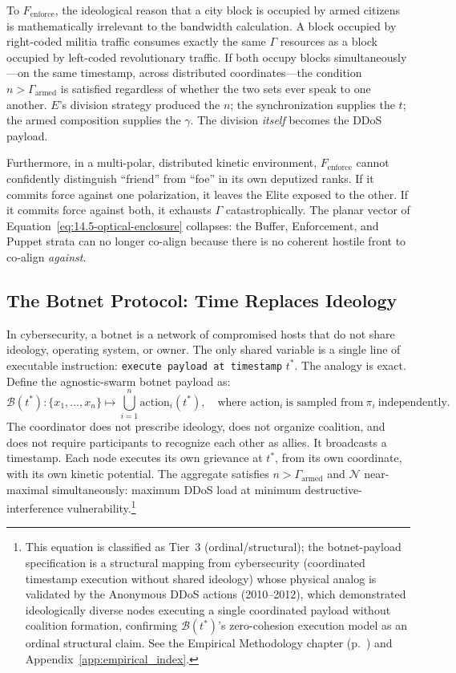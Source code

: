To $F_{\text{enforce}}$, the ideological reason that a city block is occupied by armed citizens is mathematically irrelevant to the bandwidth calculation. A block occupied by right-coded militia traffic consumes exactly the same $\Gamma$ resources as a block occupied by left-coded revolutionary traffic. If both occupy blocks simultaneously---on the same timestamp, across distributed coordinates---the condition $n > \Gamma_{\text{armed}}$ is satisfied regardless of whether the two sets ever speak to one another. $E$'s division strategy produced the $n$; the synchronization supplies the $t$; the armed composition supplies the $\gamma$. The division \textit{itself} becomes the DDoS payload.

Furthermore, in a multi-polar, distributed kinetic environment, $F_{\text{enforce}}$ cannot confidently distinguish ``friend'' from ``foe'' in its own deputized ranks. If it commits force against one polarization, it leaves the Elite exposed to the other. If it commits force against both, it exhausts $\Gamma$ catastrophically. The planar vector of Equation~\eqref{eq:14.5-optical-enclosure} collapses: the Buffer, Enforcement, and Puppet strata can no longer co-align because there is no coherent hostile front to co-align \textit{against}.

\subsection{The Botnet Protocol: Time Replaces Ideology}

In cybersecurity, a botnet is a network of compromised hosts that do not share ideology, operating system, or owner. The only shared variable is a single line of executable instruction: \texttt{execute payload at timestamp} $t^{*}$. The analogy is exact. Define the agnostic-swarm botnet payload as:
\begin{equation}\label{eq:14.16-agnostic-swarm-payload}
\mathcal{B}(t^{*}) : \{x_1, \ldots, x_n\} \longmapsto \bigcup_{i=1}^{n} \text{action}_i(t^{*}), \quad \text{where action}_i \ \text{is sampled from} \ \pi_i \ \text{independently.}
\end{equation}
The coordinator does not prescribe ideology, does not organize coalition, and does not require participants to recognize each other as allies. It broadcasts a timestamp. Each node executes its own grievance at $t^{*}$, from its own coordinate, with its own kinetic potential. The aggregate satisfies $n > \Gamma_{\text{armed}}$ and $\mathcal{N}$ near-maximal simultaneously: maximum DDoS load at minimum destructive-interference vulnerability.\footnote{This equation is classified as Tier~3 (ordinal/structural); the botnet-payload specification is a structural mapping from cybersecurity (coordinated timestamp execution without shared ideology) whose physical analog is validated by the Anonymous DDoS actions (2010--2012), which demonstrated ideologically diverse nodes executing a single coordinated payload without coalition formation, confirming $\mathcal{B}(t^{*})$'s zero-cohesion execution model as an ordinal structural claim. See the Empirical Methodology chapter (p.~\pageref{ch:empirical_methodology}) and Appendix~\ref{app:empirical_index}.}

